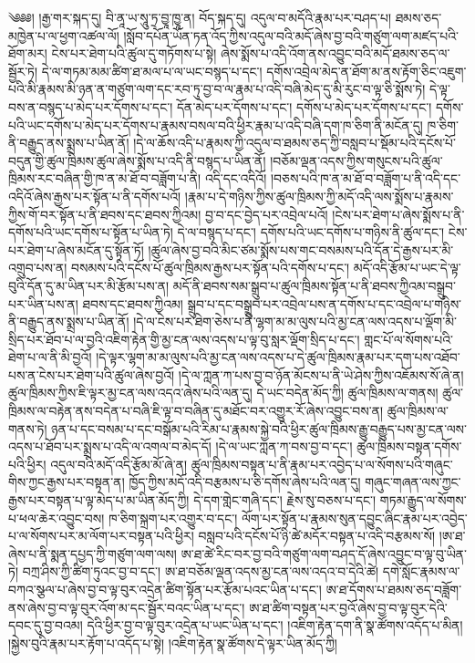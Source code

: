 \setcounter{footnote}{0} 
༄༅༅། །རྒྱ་གར་སྐད་དུ། བི་ནཱ་ཡ་སཱུ་ཏྲ་བྱཱ་ཁྱཱ་ན། བོད་སྐད་དུ། འདུལ་བ་མདོའི་རྣམ་པར་བཤད་པ། ཐམས་ཅད་མཁྱེན་པ་ལ་ཕྱག་འཚལ་ལོ། །སློབ་དཔོན་ཡོན་ཏན་འོད་ཀྱིས་འདུལ་བའི་མདོ་ཞེས་བྱ་བའི་གཙུག་ལག་མཛད་པའི་ཐོག་མར། ངེས་པར་ཐེག་པའི་ཚུལ་དུ་གཏོགས་པ་སྟེ། ཞེས་སྨོས་པ་འདི་འོག་ནས་འབྱུང་བའི་མདོ་ཐམས་ཅད་ལ་སྦྱོར་ཏེ། དེ་ལ་གཏམ་མམ་ཚིག་ཐ་མལ་པ་ལ་ཡང་བསྙད་པ་དང་། དགོས་འབྲེལ་མེད་ན་ཐོག་མ་ནས་རྟོག་ཅིང་འཇུག་པའི་མི་རྣམས་མི་ཉན་ན་གཙུག་ལག་དང་རབ་ཏུ་བྱ་བ་ལ་རྣམ་པ་འདི་བཞི་མེད་དུ་མི་རུང་བ་ལྟ་ཅི་སྨོས་ཏེ། དེ་ལྟ་བས་ན་བསྙད་པ་མེད་པར་དོགས་པ་དང་། དོན་མེད་པར་དོགས་པ་དང་། དགོས་པ་མེད་པར་དོགས་པ་དང་། དགོས་པའི་ཡང་དགོས་པ་མེད་པར་དོགས་པ་རྣམས་བསལ་བའི་ཕྱིར་རྣམ་པ་འདི་བཞི་དག་ཁ་ཅིག་ནི་མངོན་དུ། ཁ་ཅིག་ནི་བརྒྱུད་ནས་སྨྲས་པ་ཡིན་ནོ། །དེ་ལ་ཆོས་འདི་པ་རྣམས་ཀྱི་འདུལ་བ་ཐམས་ཅད་ཀྱི་བསླབ་པ་སྡོམ་པའི་དངོས་པོ་བདུན་གྱི་ཚུལ་ཁྲིམས་ཚུལ་ཞེས་སྨོས་པ་འདི་ནི་བསྙད་པ་ཡིན་ནོ། །བཅོམ་ལྡན་འདས་ཀྱིས་གསུངས་པའི་ཚུལ་ཁྲིམས་རང་བཞིན་གྱི་ཁ་ན་མ་ཐོ་བ་བཟློག་པ་ནི། འདི་དང་འདིའོ། །བཅས་པའི་ཁ་ན་མ་ཐོ་བ་བཟློག་པ་ནི་འདི་དང་འདིའོ་ཞེས་རྒྱས་པར་སྟོན་པ་ནི་དགོས་པའོ། །རྣམ་པ་དེ་གཉིས་ཀྱིས་ཚུལ་ཁྲིམས་ཀྱི་མདོ་འདི་ལས་སྨོས་པ་རྣམས་ཀྱིས་གོ་བར་སྟོན་པ་ནི་ཐབས་དང་ཐབས་ཀྱིའམ། བྱ་བ་དང་བྱེད་པར་འབྲེལ་པའོ། །ངེས་པར་ཐེག་པ་ཞེས་སྨོས་པ་ནི་དགོས་པའི་ཡང་དགོས་པ་སྟོན་པ་ཡིན་ཏེ། དེ་ལ་བསྙད་པ་དང་། དགོས་པའི་ཡང་དགོས་པ་གཉིས་ནི་ཚུལ་དང་། ངེས་པར་ཐེག་པ་ཞེས་མངོན་དུ་སྟོན་ཏོ། །ཚུལ་ཞེས་བྱ་བའི་མིང་ཙམ་སྨོས་པས་གང་བསམས་པའི་དོན་དེ་རྒྱས་པར་མི་འགྲུབ་པས་ན། བསམས་པའི་དངོས་པོ་ཚུལ་ཁྲིམས་རྒྱས་པར་སྟོན་པའི་དགོས་པ་དང་། མདོ་འདི་རྩོམ་པ་ཡང་དེ་ལྟ་བུའི་དོན་དུ་མ་ཡིན་པར་མི་རྩོམ་པས་ན། མདོ་ནི་ཐབས་སམ་སྒྲུབ་པ་ཚུལ་ཁྲིམས་སྟོན་པ་ནི་ཐབས་ཀྱིའམ་བསྒྲུབ་པར་ཡིན་པས་ན། ཐབས་དང་ཐབས་ཀྱིའམ། སྒྲུབ་པ་དང་བསྒྲུབ་པར་འབྲེལ་པས་ན་དགོས་པ་དང་འབྲེལ་པ་གཉིས་ནི་བརྒྱུད་ནས་སྨྲས་པ་ཡིན་ནོ། །དེ་ལ་ངེས་པར་ཐེག་ཅེས་པ་ནི་ལྷག་མ་མ་ལུས་པའི་མྱ་ངན་ལས་འདས་པ་ལྡོག་མི་སྲིད་པར་ཐོབ་པ་ལ་བྱའི་འཇིག་རྟེན་གྱི་མྱ་ངན་ལས་འདས་པ་ལྟ་བུ་སླར་ལྡོག་སྲིད་པ་དང་། གླང་པོ་ལ་སོགས་པའི་ཐེག་པ་ལ་ནི་མི་བྱའོ། །དེ་ལྟར་ལྷག་མ་མ་ལུས་པའི་མྱ་ངན་ལས་འདས་པ་དེ་ཚུལ་ཁྲིམས་རྣམ་པར་དག་པས་འཐོབ་པས་ན་ངེས་པར་ཐེག་པའི་ཚུལ་ཞེས་བྱའོ། །དེ་ལ་ཀླན་ཀ་པས་བྱ་བ་ཉོན་མོངས་པ་ནི་ཡེ་ཤེས་ཀྱིས་འཇོམས་སོ་ཞེ་ན། ཚུལ་ཁྲིམས་ཀྱིས་ཇི་ལྟར་མྱ་ངན་ལས་འདའ་ཞེས་པའི་ལན་དུ། དེ་ཡང་བདེན་མོད་ཀྱི། ཚུལ་ཁྲིམས་ལ་གནས། ཚུལ་ཁྲིམས་ལ་བརྟེན་ནས་བདེན་པ་བཞི་ཇི་ལྟ་བ་བཞིན་དུ་མཐོང་བར་འགྱུར་རོ་ཞེས་འབྱུང་བས་ན། ཚུལ་ཁྲིམས་ལ་གནས་ཏེ། ཉན་པ་དང་བསམ་པ་དང་བསྒོམ་པའི་རིམ་པ་རྣམས་སྐྱེ་བའི་ཕྱིར་ཚུལ་ཁྲིམས་རྒྱུ་བརྒྱུད་པས་མྱ་ངན་ལས་འདས་པ་ཐོབ་པར་སྨྲས་པ་འདི་ལ་འགལ་བ་མེད་དོ། །དེ་ལ་ཡང་ཀླན་ཀ་བས་བྱ་བ་དང་། ཚུལ་ཁྲིམས་བསྟན་དགོས་པའི་ཕྱིར། འདུལ་བའི་མདོ་འདི་རྩོམ་མོ་ཞེ་ན། ཚུལ་ཁྲིམས་བསྟན་པ་ནི་རྣམ་པར་འབྱེད་པ་ལ་སོགས་པའི་གཞུང་གིས་ཀྱང་རྒྱས་པར་བསྟན་ན། ཁྱོད་ཀྱིས་མདོ་འདི་བརྩམས་པ་ཅི་དགོས་ཞེས་པའི་ལན་དུ། གཞུང་གཞན་ལས་ཀྱང་རྒྱས་པར་བསྟན་པ་ལྟ་མེད་པ་མ་ཡིན་མོད་ཀྱི། དེ་དག་གླེང་གཞི་དང་། རྗེས་སུ་བཅས་པ་དང་། གཏམ་རྒྱུད་ལ་སོགས་པ་ཕལ་ཆེར་འབྱུང་བས། ཁ་ཅིག་སྐྲག་པར་འགྱུར་བ་དང་། ལོག་པར་སྟོན་པ་རྣམས་སུན་དབྱུང་ཞིང་རྣམ་པར་འབྱེད་པ་ལ་སོགས་པར་མ་ལོག་པར་བསྟན་པའི་ཕྱིར། བསླབ་པའི་དངོས་པོ་ཉི་ཚེ་མདོར་བསྟན་པ་འདི་བརྩམས་སོ། །ཨ་ཐ་ཞེས་པ་ནི་སྨན་དཔྱད་ཀྱི་གཙུག་ལག་ལས། ཨ་ཐ་ཚེ་རིང་བར་བྱ་བའི་གཙུག་ལག་བཤད་དོ་ཞེས་འབྱུང་བ་ལྟ་བུ་ཡིན་ཏེ། བཀྲ་ཤིས་ཀྱི་ཚིག་ཏུའང་བྱ་བ་དང་། ཨ་ཐ་བཅོམ་ལྡན་འདས་མྱ་ངན་ལས་འདའ་བ་དེའི་ཚེ། དགེ་སློང་རྣམས་ལ་བཀའ་སྩལ་པ་ཞེས་བྱ་བ་ལྟ་བུར་འདྲེན་ཚིག་སྟོན་པར་རྩོམ་པའང་ཡིན་པ་དང་། ཨ་ཐ་དོགས་པ་ཐམས་ཅད་བཟློག་ནས་ཞེས་བྱ་བ་ལྟ་བུར་འོག་མ་དང་སྦྱོར་བའང་ཡིན་པ་དང་། ཨ་ཐ་ཚིག་བསྟན་པར་བྱའོ་ཞེས་བྱ་བ་ལྟ་བུར་དེའི་དབང་དུ་བྱ་བའམ། དེའི་ཕྱིར་བྱ་བ་ལྟ་བུར་འདྲེན་པ་ཡང་ཡིན་པ་དང་།  །འཇིག་རྟེན་དག་ནི་སྣ་ཚོགས་འདོད་པ་མིན། །སྐྱེས་བུའི་རྣམ་པར་རྟོག་པ་འདོད་པ་སྟེ། །འཇིག་རྟེན་སྣ་ཚོགས་དེ་ལྟར་ཡིན་མོད་ཀྱི། 
